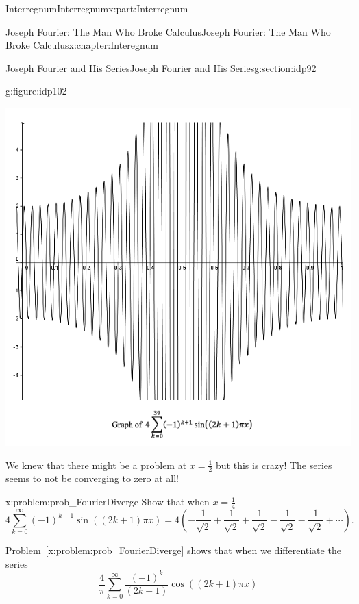 \documentclass[oneside,10pt,]{book}
\newcommand{\xreffont}{\relax}
\numberwithin{equation}{section}
\begin{document}
\begin{partptx}{Interregnum}{}{Interregnum}{}{}{x:part:Interregnum}
\begin{chapterptx}{Joseph Fourier: The Man Who Broke Calculus}{}{Joseph Fourier: The Man Who Broke Calculus}{}{}{x:chapter:Interegnum}
\begin{sectionptx}{Joseph Fourier and His Series}{}{Joseph Fourier and His Series}{}{}{g:section:idp92}
\begin{figureptx}{}{g:figure:idp102}{}
\begin{image}{0}{1}{0}
\includegraphics[width=\linewidth]{images/FourierEx11.png}
\end{image}%
\tcblower
\end{figureptx}%
%
\par
We knew that there might be a problem at \(x=\frac{1}{2}\) but this is crazy! The series seems to not be converging to zero at all!%
\begin{problem}{}{x:problem:prob_FourierDiverge}%
 Show that when \(x=\frac{1}{4}\)%
\begin{equation*}
4\sum_{k=0}^\infty\left(-1\right)^{k+1} \sin\left(\left(2k+1\right)\pi x\right)=4\left(-\frac{1}{\sqrt{2}}+\frac{1}{\sqrt{2}}+\frac{1}{\sqrt{2}}- \frac{1}{\sqrt{2}}-\frac{1}{\sqrt{2}}+\cdots\right)\text{.}
\end{equation*}
%
\end{problem}
\hyperref[x:problem:prob_FourierDiverge]{Problem~{\xreffont\ref{x:problem:prob_FourierDiverge}}} shows that when we differentiate the series%
\begin{equation*}
\frac{4}{\pi}\sum_{k=0}^\infty\frac{\left(-1\right)^k}{\left(2k+1\right)} \cos\left(\left(2k+1\right)\pi x\right)
\end{equation*}

\end{sectionptx}
\end{chapterptx}
\end{partptx}
\end{document}
